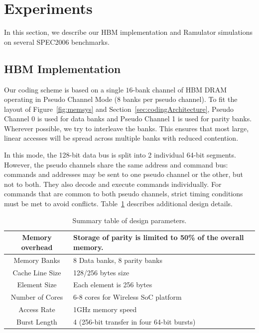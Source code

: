   \section{Experiments}
\label{sec:experiments}

In this section, we describe our HBM implementation and Ramulator simulations on several SPEC2006 benchmarks.

\subsection{HBM Implementation}
Our coding scheme is based on a single $16$-bank channel of HBM DRAM operating in Pseudo Channel Mode ($8$ banks per pseudo channel). To fit the layout of Figure~\ref{fig:memsys} and Section~\ref{sec:codingArchitecture}, Pseudo Channel 0 is used for data banks and Pseudo Channel 1 is used for parity banks. 
%
%
Wherever possible, we try to interleave the banks. This ensures that most large, linear accesses will be spread across multiple banks with reduced contention.

In this mode, the 128-bit data bus is split into 2 individual 64-bit segments. 
However, the pseudo channels share the same address and command bus: commands and addresses may be sent to one pseudo channel or the other, but not to both. They also decode and execute commands individually. For commands that are common to both pseudo channels, strict timing conditions must be met to avoid conflicts.
Table~\ref{tab:design_params} describes additional design details.
%
\begin{table}[h!]
 \small
  \centering
  \begin{tabular}{|c|p{5cm}|}
    \hline
    Memory overhead & Storage of parity is limited to 50\% of the overall memory. \\
    \hline
    Memory Banks & 8 Data banks, 8 parity banks \\
    \hline           
    Cache Line Size & 128/256 bytes size \\ \hline  
    Element Size & Each element is 256 bytes \\ \hline  
    Number of Cores & 6-8 cores for Wireless SoC platform \\ \hline  
    Access Rate & 1GHz memory speed \\ \hline  
    Burst Length & 4 (256-bit transfer in four 64-bit bursts)\\ \hline
  \end{tabular}
  \caption{Summary table of design parameters.}
  \label{tab:design_params}
\end{table}


